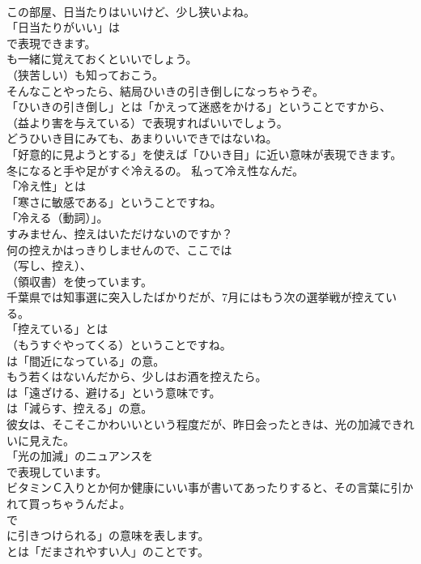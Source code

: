 \documentclass[8pt]{extreport}
\begin{document}
\begin{CJK}{UTF8}{min}
\\	この部屋、日当たりはいいけど、少し狭いよね。 
\\	「日当たりがいい」は
\\	で表現できます。
\\	も一緒に覚えておくといいでしょう。
\\	（狭苦しい）も知っておこう。	
\\	そんなことやったら、結局ひいきの引き倒しになっちゃうぞ。 
\\	「ひいきの引き倒し」とは「かえって迷惑をかける」ということですから、
\\	（益より害を与えている）で表現すればいいでしょう。	
\\	どうひいき目にみても、あまりいいできではないね。 
\\	「好意的に見ようとする」を使えば「ひいき目」に近い意味が表現できます。	
\\	冬になると手や足がすぐ冷えるの。 私って冷え性なんだ。 
\\	「冷え性」とは
\\	「寒さに敏感である」ということですね。
\\	「冷える（動詞）」。	
\\	すみません、控えはいただけないのですか？ 
\\	何の控えかはっきりしませんので、ここでは 
\\	（写し、控え）、
\\	（領収書）を使っています。	
\\	千葉県では知事選に突入したばかりだが、7月にはもう次の選挙戦が控えている。 
\\	「控えている」とは
\\	（もうすぐやってくる）ということですね。
\\	は「間近になっている」の意。	
\\	もう若くはないんだから、少しはお酒を控えたら。 
\\	は「遠ざける、避ける」という意味です。
\\	は「減らす、控える」の意。	
\\	彼女は、そこそこかわいいという程度だが、昨日会ったときは、光の加減できれいに見えた。 
\\	「光の加減」のニュアンスを 
\\	で表現しています。	
\\	ビタミンＣ入りとか何か健康にいい事が書いてあったりすると、その言葉に引かれて買っちゃうんだよ。 
\\	で
\\	に引きつけられる」の意味を表します。
\\	とは「だまされやすい人」のことです。	

\end{CJK}
\end{document}

